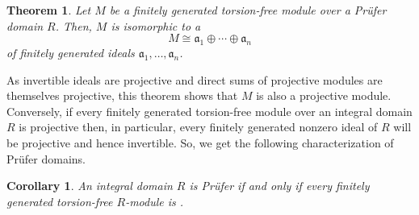 \documentclass[12pt]{article}
\newtheorem*{theorem*}{Theorem}
\newtheorem*{corollary*}{Corollary}
\begin{document}
\begin{theorem*}
Let $M$ be a finitely generated torsion-free module over a Pr\"ufer domain $R$. Then, $M$ is isomorphic to a 
\begin{equation*}
M\cong \mathfrak{a}_1\oplus\cdots\oplus\mathfrak{a}_n
\end{equation*}
of finitely generated ideals $\mathfrak{a}_1,\ldots,\mathfrak{a}_n$.
\end{theorem*}

As invertible ideals are projective and direct sums of projective modules are themselves projective, this theorem shows that $M$ is also a projective module. Conversely, if every finitely generated torsion-free module over an integral domain $R$ is projective then, in particular, every finitely generated nonzero ideal of $R$ will be projective and hence invertible. So, we get the following characterization of Pr\"ufer domains.

\begin{corollary*}
An integral domain $R$ is Pr\"ufer if and only if every finitely generated torsion-free $R$-module is .
\end{corollary*}

\end{document}
